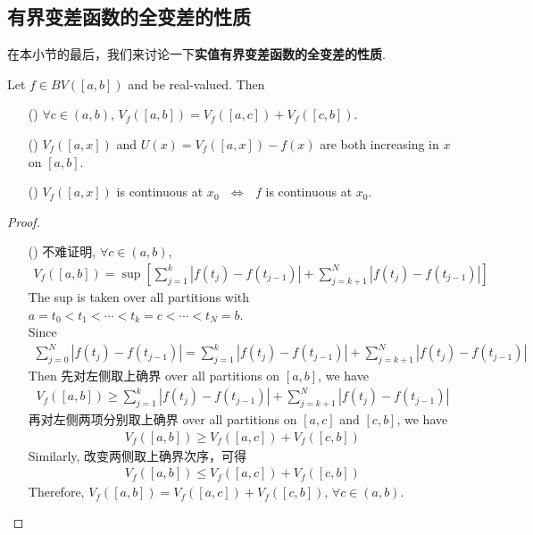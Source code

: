 \newpage
\subsection{有界变差函数的全变差的性质}
	在本小节的最后，我们来讨论一下\textbf{实值有界变差函数的全变差的性质}.
	\begin{proposition}\label{prop 4.4.1}
		Let $f \in BV([a , b])$ and be real-valued. Then
		\begin{enumerate}
			\item [(\rmnum{1})] $\forall c \in (a , b)$, $V_{f}([a , b]) = V_{f}([a , c]) + V_{f}([c , b])$.
			
			\vspace{1em}
			
			\item[(\rmnum{2})] $V_{f}([a , x])$ and $U(x) = V_{f}([a , x]) - f(x)$ are both increasing in $x$ on $[a , b]$.
			
			\vspace{1em}
			
			\item[(\rmnum{3})] $V_{f}([a , x])$ is continuous at $x_0$ $\,\, \Leftrightarrow \,\,$ $f$ is continuous at $x_0$.
		\end{enumerate}
	
		\vspace{4em}
		\begin{proof}
			\begin{enumerate}
				\item[(\rmnum{1})] 不难证明, $\forall c \in (a,  b)$,
				\begin{align}
					V_{f}([a , b]) = \sup{\left[ \sum_{j = 1}^{k}{\left| f(t_j) - f(t_{j - 1}) \right|} + \sum_{j = k + 1}^{N}{\left| f(t_j) - f(t_{j - 1}) \right|} \right]}
				\end{align}
				The sup is taken over all partitions with $a = t_0 < t_1 < \cdots < t_k = c < \cdots < t_N = b$. \\
				Since
				\begin{align}
					\sum_{j = 0}^{N}{\left| f(t_j) - f(t_{j - 1}) \right|}
					= \sum_{j = 1}^{k}{\left| f(t_j) - f(t_{j - 1}) \right|} + \sum_{j = k + 1}^{N}{\left| f(t_j) - f(t_{j - 1}) \right|}
				\end{align}
				Then 先对左侧取上确界 over all partitions on $[a , b]$, we have
				\begin{align}
					V_{f}([a , b]) 
					\geq \sum_{j = 1}^{k}{\left| f(t_j) - f(t_{j - 1}) \right|} + \sum_{j = k + 1}^{N}{\left| f(t_j) - f(t_{j - 1}) \right|}
				\end{align}
				再对左侧两项分别取上确界 over all partitions on $[a , c]$ and $[c , b]$, we have
				\begin{align}
					V_{f}([a , b]) \geq V_{f}([a , c]) + V_{f}([c , b])
				\end{align}
				Similarly, 改变两侧取上确界次序，可得
				\begin{align}
					V_{f}([a , b]) \leq V_{f}([a , c]) + V_{f}([c , b])
				\end{align}
				Therefore, $V_{f}([a , b]) = V_{f}([a , c]) + V_{f}([c , b])$, $\forall c \in (a , b)$.
				

\end{enumerate}
\end{proof}
\end{proposition}
